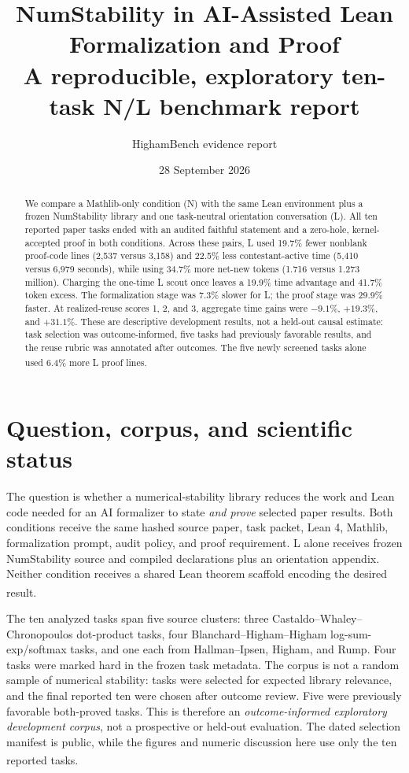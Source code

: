 \documentclass[10pt,a4paper]{article}
\title{\vspace{-13mm}\textbf{NumStability in AI-Assisted Lean Formalization and Proof}\\[2mm]
\large A reproducible, exploratory ten-task N/L benchmark report}
\author{HighamBench evidence report}
\date{28 September 2026}
\newcommand{\src}[1]{\textsuperscript{\cite{#1}}}
\begin{document}
\maketitle

\begin{abstract}
We compare a Mathlib-only condition (N) with the same Lean environment plus a
frozen NumStability library and one task-neutral orientation conversation (L).
All ten reported paper tasks ended with an audited faithful statement and a
zero-hole, kernel-accepted proof in both conditions. Across these pairs, L
used 19.7\% fewer nonblank proof-code lines (2,537 versus 3,158) and 22.5\%
less contestant-active time (5,410 versus 6,979 seconds), while using 34.7\%
more net-new tokens (1.716 versus 1.273 million). Charging the one-time L
scout once leaves a 19.9\% time advantage and 41.7\% token excess. The
formalization stage was 7.3\% slower for L; the proof stage was 29.9\% faster.
At realized-reuse scores 1, 2, and 3, aggregate time gains were $-9.1\%$,
$+19.3\%$, and $+31.1\%$. These are descriptive development results, not a
held-out causal estimate: task selection was outcome-informed, five tasks had
previously favorable results, and the reuse rubric was annotated after
outcomes. The five newly screened tasks alone used 6.4\% more L proof lines.
\src{summary,selection,reuse}
\end{abstract}

\section{Question, corpus, and scientific status}

The question is whether a numerical-stability library reduces the work and
Lean code needed for an AI formalizer to state \emph{and prove} selected paper
results. Both conditions receive the same hashed source paper, task packet,
Lean 4, Mathlib, formalization prompt, audit policy, and proof requirement. L
alone receives frozen NumStability source and compiled declarations plus an
orientation appendix. Neither condition receives a shared Lean theorem
scaffold encoding the desired result.\src{protocol,prompts,taskledger}

The ten analyzed tasks span five source clusters: three Castaldo--Whaley--
Chronopoulos dot-product tasks, four Blanchard--Higham--Higham
log-sum-exp/softmax tasks, and one each from Hallman--Ipsen, Higham, and Rump.
Four tasks were marked hard in the frozen task metadata. The corpus is not a
random sample of numerical stability: tasks were selected for expected
library relevance, and the final reported ten were chosen after outcome
review. Five were previously favorable both-proved tasks. This is therefore
an \emph{outcome-informed exploratory development corpus}, not a prospective
or held-out evaluation. The dated selection manifest is public, while the
figures and numeric discussion here use only the ten reported tasks.
\src{selection,source,taskledger}
\end{document}

